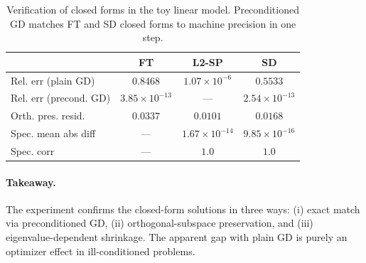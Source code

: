 \begin{table}[h]
\centering
\small
\begin{tabular}{lccc}
\toprule
 & \textbf{FT} & \textbf{L2-SP} & \textbf{SD} \\
\midrule
Rel. err (plain GD) & $0.8468$ & $1.07\times 10^{-6}$ & $0.5533$ \\
Rel. err (precond. GD) & $3.85\times 10^{-13}$ & --- & $2.54\times 10^{-13}$ \\
Orth. pres. resid. & $0.0337$ & $0.0101$ & $0.0168$ \\
Spec. mean abs diff & --- & $1.67\times 10^{-14}$ & $9.85\times 10^{-16}$ \\
Spec. corr & --- & $1.0$ & $1.0$ \\
\bottomrule
\end{tabular}
\caption{Verification of closed forms in the toy linear model. Preconditioned GD matches FT and SD closed forms to machine precision in one step.}
\label{tab:toy-linear}
\end{table}

\paragraph{Takeaway.}
The experiment confirms the closed-form solutions in three ways: (i) exact match via preconditioned GD, (ii) orthogonal-subspace preservation, and (iii) eigenvalue-dependent shrinkage. The apparent gap with plain GD is purely an optimizer effect in ill-conditioned problems.

